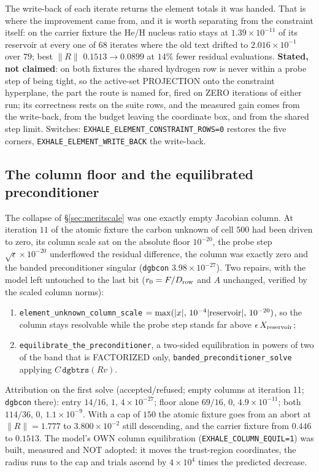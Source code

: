 \documentclass[english,a4paper]{my_memo}
\newcommand{\code}[1]{\texttt{#1}}
\begin{document}
The write-back of each iterate returns the element totals it was handed. That
is where the improvement came from, and it is worth separating from the
constraint itself: on the carrier fixture the He/H nucleus ratio stays at
$1.39\times10^{-11}$ of its reservoir at every one of $68$ iterates where the
old text drifted to $2.016\times10^{-1}$ over $79$; best $\|R\|$
$0.1513 \rightarrow 0.0899$ at $14\%$ fewer residual evaluations.
\textbf{Stated, not claimed}: on both fixtures the shared hydrogen row is
never within a probe step of being tight, so the active-set PROJECTION onto
the constraint hyperplane, the part the route is named for, fired on ZERO
iterations of either run; its correctness rests on the suite rows, and the
measured gain comes from the write-back, from the budget leaving the
coordinate box, and from the shared step limit. Switches:
\code{EXHALE\_ELEMENT\_CONSTRAINT\_ROWS=0} restores the five corners,
\code{EXHALE\_ELEMENT\_WRITE\_BACK} the write-back.

\subsection{The column floor and the equilibrated preconditioner}
\label{sec:precond}

The collapse of \S\ref{sec:meritscale} was one exactly empty Jacobian column.
At iteration $11$ of the atomic fixture the carbon unknown of cell $500$ had
been driven to zero, its column scale sat on the absolute floor $10^{-20}$,
the probe step $\sqrt{\epsilon}\times10^{-20}$ underflowed the residual
difference, the column was exactly zero and the banded preconditioner
singular (\code{dgbcon} $3.98\times10^{-27}$). Two repairs, with the model
left untouched to the last bit ($r_0 = F/D_{\rm row}$ and $A$ unchanged,
verified by the scaled column norms):

\begin{enumerate}
\item \code{element\_unknown\_column\_scale}
  $= \max(|x|,\,10^{-4}|{\rm reservoir}|,\,10^{-20})$, so the column stays
  resolvable while the probe step stands far above
  $\epsilon\,X_{\rm reservoir}$;
\item \code{equilibrate\_the\_preconditioner}, a two-sided equilibration in
  powers of two of the band that is FACTORIZED only,
  \code{banded\_preconditioner\_solve} applying $C\,\code{dgbtrs}(Rv)$.
\end{enumerate}

\noindent Attribution on the first solve (accepted/refused; empty columns at
iteration 11; \code{dgbcon} there): entry $14/16$, $1$,
$4\times10^{-27}$; floor alone $69/16$, $0$, $4.9\times10^{-11}$; both
$114/36$, $0$, $1.1\times10^{-9}$. With a cap of $150$ the atomic fixture goes
from an abort at $\|R\| = 1.777$ to $3.800\times10^{-2}$ still descending, and
the carrier fixture from $0.446$ to $0.1513$. The model's OWN column
equilibration (\code{EXHALE\_COLUMN\_EQUIL=1}) was built, measured and NOT
adopted: it moves the trust-region coordinates, the radius runs to the cap
and trials ascend by $4\times10^{4}$ times the predicted decrease.
\end{document}
